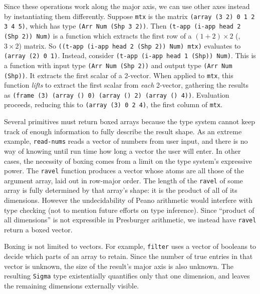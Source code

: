 Since these operations work along the major axis,
we can use other axes instead
by instantiating them differently.
Suppose {\tt mtx} is the matrix {\tt (array (3 2) 0 1 2 3 4 5)},
which has type {\tt (Arr Num (Shp 3 2))}.
Then {\tt (t-app (i-app head 2 (Shp 2)) Num)}
is a function which extracts the first row
of a $(1+2) \times 2$ (\ie, $3 \times 2$) matrix.
So {\tt ((t-app (i-app head 2 (Shp 2)) Num) mtx)}
evaluates to {\tt (array (2) 0 1)}.
Instead, consider {\tt (t-app (i-app head 1 (Shp)) Num)}.
This is a function with input type {\tt (Arr Num (Shp 2))}
and output type {\tt (Arr Num (Shp))}.
It extracts the first scalar of a 2-vector.
When applied to {\tt mtx},
this function \emph{lifts}
to extract the first scalar from \emph{each} 2-vector,
gathering the results as
{\tt (frame (3) (array () 0) (array () 2) (array () 4))}.
Evaluation proceeds, reducing this to {\tt (array (3) 0 2 4)},
the first column of {\tt mtx}.

Several primitives must return boxed arrays
because the type system cannot keep track of enough information
to fully describe the result shape.
As an extreme example,
{\tt read-nums} reads a vector of numbers from user input,
and there is no way of knowing until run time
how long a vector the user will enter.
In other cases, the necessity of boxing
comes from a limit on the type system's expressive power.
The {\tt ravel} function produces a vector
whose atoms are all those of the argument array,
laid out in row-major order.
The length of the {\tt ravel} of some array
is fully determined by that array's shape:
it is the product of all of its dimensions.
However the undecidability of Peano arithmetic
would interfere with type checking
(not to mention future efforts on type inference).
Since ``product of all dimensions'' is not expressible in Presburger arithmetic,
we instead have {\tt ravel} return a boxed vector.

Boxing is not limited to vectors.
For example, {\tt filter} uses a vector of booleans
to decide which parts of an array to retain.
Since the number of true entries in that vector is unknown,
the size of the result's major axis is also unknown.
The resulting {\tt Sigma} type
existentially quantifies only that one dimension,
and leaves the remaining dimensions externally visible.

\FigArrayOps

